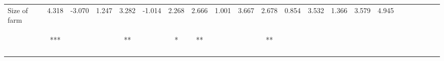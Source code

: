 \begin{tabular}{lccccccccccccccccccccc}
\noalign{\smallskip}Size of farm & 4.318 & -3.070 & 1.247 & 3.282 & -1.014 & 2.268 & 2.666 & 1.001 & 3.667 & 2.678 & 0.854 & 3.532 & 1.366 & 3.579 & 4.945 &  &  &  &  &  & \\
 & \begin{footnotesize}[1.512]***\end{footnotesize} & \begin{footnotesize}[1.939]\end{footnotesize} & \begin{footnotesize}[1.344]\end{footnotesize} & \begin{footnotesize}[1.435]**\end{footnotesize} & \begin{footnotesize}[1.807]\end{footnotesize} & \begin{footnotesize}[1.335]*\end{footnotesize} & \begin{footnotesize}[1.100]**\end{footnotesize} & \begin{footnotesize}[3.345]\end{footnotesize} & \begin{footnotesize}[3.198]\end{footnotesize} & \begin{footnotesize}[1.102]**\end{footnotesize} & \begin{footnotesize}[3.355]\end{footnotesize} & \begin{footnotesize}[3.199]\end{footnotesize} & \begin{footnotesize}[2.196]\end{footnotesize} & \begin{footnotesize}[5.155]\end{footnotesize} & \begin{footnotesize}[3.388]\end{footnotesize} & \begin{footnotesize}\end{footnotesize} & \begin{footnotesize}\end{footnotesize} & \begin{footnotesize}\end{footnotesize} & \begin{footnotesize}\end{footnotesize} & \begin{footnotesize}\end{footnotesize} & \begin{footnotesize}\end{footnotesize}\\
\noalign{\smallskip}\hline\end{tabular}
